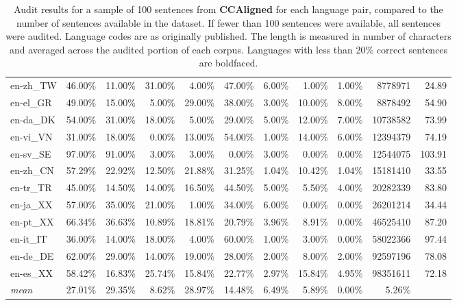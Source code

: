 \begin{table*}[hbt!]
{\begin{tabular}{l|rrrr|rrrr|rr}
            en-zh\_TW               & 46.00\% & 11.00\% & 31.00\% & 4.00\%  & 47.00\% & 6.00\%  & 1.00\%  & 1.00\%  & 8778971     & 24.89             \\
            en-el\_GR               & 49.00\% & 15.00\% & 5.00\%  & 29.00\% & 38.00\% & 3.00\%  & 10.00\% & 8.00\%  & 8878492     & 54.90             \\
            en-da\_DK               & 54.00\% & 31.00\% & 18.00\% & 5.00\%  & 29.00\% & 5.00\%  & 12.00\% & 7.00\%  & 10738582    & 73.99             \\
            en-vi\_VN               & 31.00\% & 18.00\% & 0.00\%  & 13.00\% & 54.00\% & 1.00\%  & 14.00\% & 6.00\%  & 12394379    & 74.19             \\
            en-sv\_SE               & 97.00\% & 91.00\% & 3.00\%  & 3.00\%  & 0.00\%  & 3.00\%  & 0.00\%  & 0.00\%  & 12544075    & 103.91            \\
            en-zh\_CN               & 57.29\% & 22.92\% & 12.50\% & 21.88\% & 31.25\% & 1.04\%  & 10.42\% & 1.04\%  & 15181410    & 33.55             \\
            en-tr\_TR               & 45.00\% & 14.50\% & 14.00\% & 16.50\% & 44.50\% & 5.00\%  & 5.50\%  & 4.00\%  & 20282339    & 83.80             \\
            en-ja\_XX               & 57.00\% & 35.00\% & 21.00\% & 1.00\%  & 34.00\% & 6.00\%  & 0.00\%  & 0.00\%  & 26201214    & 34.44             \\
            en-pt\_XX               & 66.34\% & 36.63\% & 10.89\% & 18.81\% & 20.79\% & 3.96\%  & 8.91\%  & 0.00\%  & 46525410    & 87.20             \\
            en-it\_IT               & 36.00\% & 14.00\% & 18.00\% & 4.00\%  & 60.00\% & 1.00\%  & 3.00\%  & 0.00\%  & 58022366    & 97.44             \\
            en-de\_DE               & 62.00\% & 29.00\% & 14.00\% & 19.00\% & 28.00\% & 2.00\%  & 8.00\%  & 2.00\%  & 92597196    & 78.08             \\
            en-es\_XX               & 58.42\% & 16.83\% & 25.74\% & 15.84\% & 22.77\% & 2.97\%  & 15.84\% & 4.95\%  & 98351611    & 72.18             \\
            \midrule
            \textit{mean}           & 27.01\% & 29.35\% & 8.62\%  & 28.97\% & 14.48\% & 6.49\%  & 5.89\%  & 0.00\%  & 5.26\%      &                   \\
            \bottomrule
        \end{tabular}%
    }
    \caption{Audit results for a sample of 100 sentences from \textbf{CCAligned} for each language pair, compared to the number of sentences available in the dataset. If fewer than 100 sentences were available, all sentences were audited. Language codes are as originally published.  The length is measured in number of characters and averaged across the audited portion of each corpus. Languages with less than 20\% correct sentences are boldfaced.}


\end{table*}
